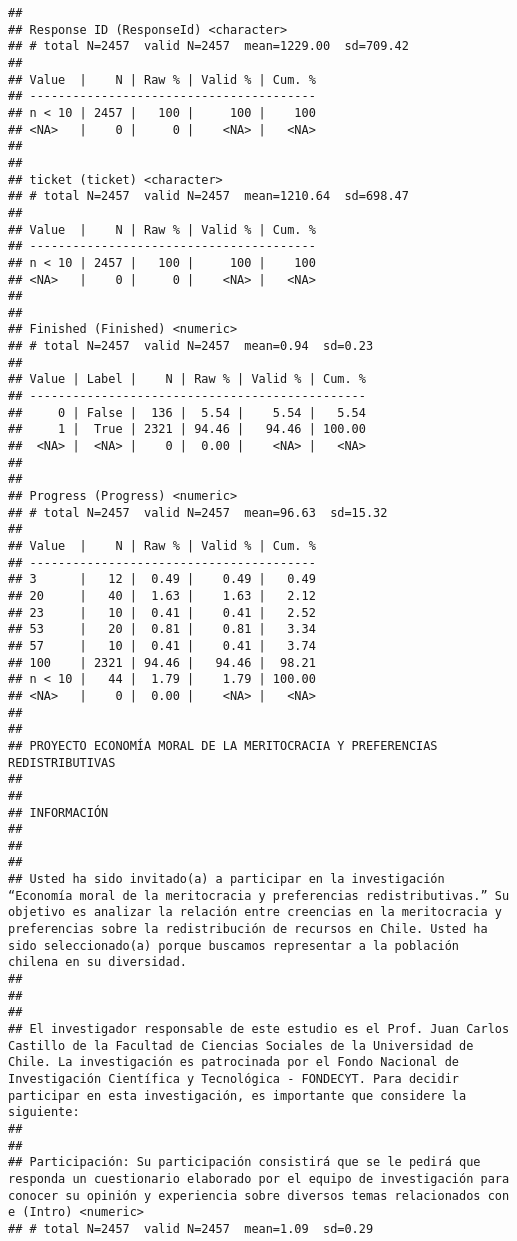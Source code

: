 \documentclass[
  10,
  landscape,
  legalpaper]{article}
\begin{document}
\begin{verbatim}
## 
## Response ID (ResponseId) <character>
## # total N=2457  valid N=2457  mean=1229.00  sd=709.42
## 
## Value  |    N | Raw % | Valid % | Cum. %
## ----------------------------------------
## n < 10 | 2457 |   100 |     100 |    100
## <NA>   |    0 |     0 |    <NA> |   <NA>
## 
## 
## ticket (ticket) <character>
## # total N=2457  valid N=2457  mean=1210.64  sd=698.47
## 
## Value  |    N | Raw % | Valid % | Cum. %
## ----------------------------------------
## n < 10 | 2457 |   100 |     100 |    100
## <NA>   |    0 |     0 |    <NA> |   <NA>
## 
## 
## Finished (Finished) <numeric>
## # total N=2457  valid N=2457  mean=0.94  sd=0.23
## 
## Value | Label |    N | Raw % | Valid % | Cum. %
## -----------------------------------------------
##     0 | False |  136 |  5.54 |    5.54 |   5.54
##     1 |  True | 2321 | 94.46 |   94.46 | 100.00
##  <NA> |  <NA> |    0 |  0.00 |    <NA> |   <NA>
## 
## 
## Progress (Progress) <numeric>
## # total N=2457  valid N=2457  mean=96.63  sd=15.32
## 
## Value  |    N | Raw % | Valid % | Cum. %
## ----------------------------------------
## 3      |   12 |  0.49 |    0.49 |   0.49
## 20     |   40 |  1.63 |    1.63 |   2.12
## 23     |   10 |  0.41 |    0.41 |   2.52
## 53     |   20 |  0.81 |    0.81 |   3.34
## 57     |   10 |  0.41 |    0.41 |   3.74
## 100    | 2321 | 94.46 |   94.46 |  98.21
## n < 10 |   44 |  1.79 |    1.79 | 100.00
## <NA>   |    0 |  0.00 |    <NA> |   <NA>
## 
## 
## PROYECTO ECONOMÍA MORAL DE LA MERITOCRACIA Y PREFERENCIAS REDISTRIBUTIVAS
##  
## 
## INFORMACIÓN
## 
##  
## 
## Usted ha sido invitado(a) a participar en la investigación “Economía moral de la meritocracia y preferencias redistributivas.” Su objetivo es analizar la relación entre creencias en la meritocracia y preferencias sobre la redistribución de recursos en Chile. Usted ha sido seleccionado(a) porque buscamos representar a la población chilena en su diversidad.
## 
## 
## 
## El investigador responsable de este estudio es el Prof. Juan Carlos Castillo de la Facultad de Ciencias Sociales de la Universidad de Chile. La investigación es patrocinada por el Fondo Nacional de Investigación Científica y Tecnológica - FONDECYT. Para decidir participar en esta investigación, es importante que considere la siguiente:
##  
## 
## Participación: Su participación consistirá que se le pedirá que responda un cuestionario elaborado por el equipo de investigación para conocer su opinión y experiencia sobre diversos temas relacionados con e (Intro) <numeric>
## # total N=2457  valid N=2457  mean=1.09  sd=0.29

\end{verbatim}
\end{document}
